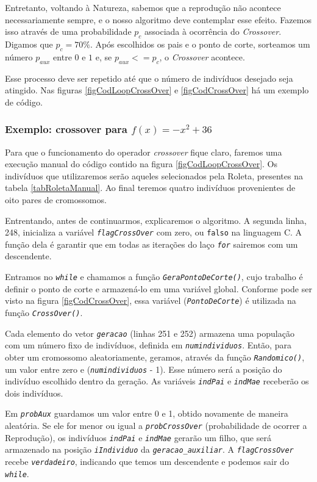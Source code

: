 	Entretanto, voltando à Natureza, sabemos que a reprodução não acontece necessariamente sempre, e o nosso algoritmo deve contemplar esse efeito. Fazemos isso através de uma probabilidade $p_c$ associada à ocorrência do \textit{Crossover}. Digamos que $p_c = 70\%$. Após escolhidos os pais e o ponto de corte, sorteamos um número $p_{aux}$ entre $0$ e $1$ e, se $p_{aux} <= p_c$, o \textit{Crossover} acontece.
	
	Esse processo deve ser repetido até que o número de indivíduos desejado seja atingido. Nas figuras \ref{figCodLoopCrossOver} e \ref{figCodCrossOver} há um exemplo de código.
	
	\subsubsection{Exemplo: crossover para $f(x) = -x^2 + 36$}
	
	Para que o funcionamento do operador \textit{crossover} fique claro, faremos uma execução manual do código contido na figura \ref{figCodLoopCrossOver}. Os indivíduos que utilizaremos serão aqueles selecionados pela Roleta, presentes na tabela \ref{tabRoletaManual}. Ao final teremos quatro indivíduos provenientes de oito pares de cromossomos.
	
	Entrentando, antes de continuarmos, explicaremos o algoritmo.	A segunda linha, 248, inicializa a variável \textit{\texttt{flagCrossOver}} com zero, ou \texttt{falso} na linguagem C. A função dela é garantir que em todas as iterações do laço \textit{\texttt{for}} sairemos com um descendente.
	
	Entramos no \textit{\texttt{while}} e chamamos a função \textit{\texttt{GeraPontoDeCorte()}}, cujo trabalho é definir o ponto de corte e armazená-lo em uma variável global. Conforme pode ser visto na figura \ref{figCodCrossOver}, essa variável (\textit{\texttt{PontoDeCorte}}) é utilizada na função \textit{\texttt{CrossOver()}}.
	
	Cada elemento do vetor \textit{\texttt{geracao}} (linhas 251 e 252) armazena uma população com um número fixo de indivíduos, definida em \textit{\texttt{numindividuos}}. Então, para obter um cromossomo aleatoriamente, geramos, através da função \textit{\texttt{Randomico()}}, um valor entre zero e (\textit{\texttt{numindividuos}} - 1). Esse número será a posição do indivíduo escolhido dentro da geração. 	As variáveis \textit{\texttt{indPai}} e \textit{\texttt{indMae}} receberão os dois indivíduos. 
	
	Em \textit{\texttt{probAux}} guardamos um valor entre 0 e 1, obtido novamente de maneira aleatória. Se ele for menor ou igual a \textit{\texttt{probCrossOver}} (probabilidade de ocorrer a Reprodução), os indivíduos \textit{\texttt{indPai}} e \textit{\texttt{indMae}} gerarão um filho, que será armazenado na posição \textit{\texttt{iIndividuo}} da \textit{\texttt{geracao\_auxiliar}}. A \textit{\texttt{flagCrossOver}} recebe \textit{\texttt{verdadeiro}}, indicando que temos um descendente e podemos sair do \textit{\texttt{while}}.
	
